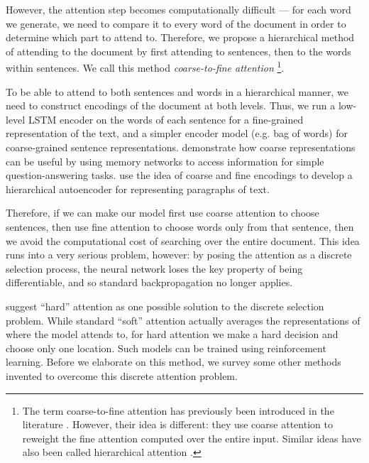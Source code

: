 \documentclass[11pt]{report}
\begin{document}
However, the attention step becomes computationally difficult --- for each word we generate, we need to compare it to every word of the document in order to determine which part to attend to. Therefore, we propose a hierarchical method of attending to the document by first attending to sentences, then to the words within sentences. We call this method \emph{coarse-to-fine attention}
\footnote{The term coarse-to-fine attention has previously been introduced in the literature \citep{mei2016}. However, their idea is different: they use coarse attention to reweight the fine attention computed over the entire input. Similar ideas have also been called hierarchical attention \citep{nallapati2016seq2seq}.}.



To be able to attend to both sentences and words in a hierarchical manner, we need to construct encodings of the document at both levels. Thus, we run a low-level LSTM encoder on the words of each sentence for a fine-grained representation of the text, and a simpler encoder model (e.g. bag of words) for coarse-grained sentence representations.
\citet{Sukhbaatar2015} demonstrate how coarse representations can be useful by using memory networks to access information for simple question-answering tasks.
\citet{li2015autoencoder} use the idea of coarse and fine encodings to develop a hierarchical autoencoder for representing paragraphs of text.

Therefore, if we can make our model first use coarse attention to choose sentences, then use fine attention to choose words only from that sentence, then we avoid the computational cost of searching over the entire document. This idea runs into a very serious problem, however: by posing the attention as a discrete selection process, the neural network loses the key property of being differentiable, and so standard backpropagation no longer applies.


\citet{xu2015captioning} suggest ``hard'' attention as one possible solution to the discrete selection problem. While standard ``soft'' attention actually averages the representations of where the model attends to, for hard attention we make a hard decision and choose only one location. Such models can be trained using reinforcement learning. Before we elaborate on this method, we survey some other methods invented to overcome this discrete attention problem.
\end{document}
